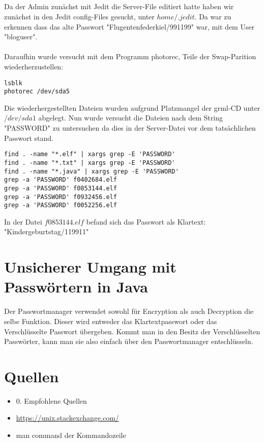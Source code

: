 \documentclass[12pt]{article}
\theoremstyle{plain}
\begin{document}
\subsection{}
Da der Admin zunächst mit Jedit die Server-File editiert hatte haben wir zunächst in den Jedit config-Files gesucht, unter $home/.jedit$. Da war zu erkennen dass das alte Passwort "Flugentenfederkiel/991199" war, mit dem User "bloguser". \\ \\ Daraufhin wurde versucht mit dem Programm photorec, Teile der Swap-Parition wiederherzustellen:
\begin{lstlisting}
lsblk
photorec /dev/sda5
\end{lstlisting}
Die wiederhergestellten Dateien wurden aufgrund Platzmangel der grml-CD unter $/dev/sda1$ abgelegt. Nun wurde versucht die Dateien nach dem String "PASSWORD" zu untersuchen da dies in der Server-Datei vor dem tatsächlichen Passwort stand.
\begin{lstlisting}
find . -name "*.elf" | xargs grep -E 'PASSWORD'
find . -name "*.txt" | xargs grep -E 'PASSWORD'
find . -name "*.java" | xargs grep -E 'PASSWORD'
grep -a 'PASSWORD' f0402684.elf
grep -a 'PASSWORD' f0853144.elf
grep -a 'PASSWORD' f0932456.elf
grep -a 'PASSWORD' f0052256.elf
\end{lstlisting}
In der Datei $f0853144.elf$ befand sich das Passwort als Klartext: "Kindergeburtstag/119911"
\section{Unsicherer Umgang mit Passwörtern in Java}
Der Passwortmanager verwendet sowohl für Encryption als auch Decryption die selbe Funktion. Dieser wird entweder das Klartextpasswort oder das Verschlüsselte Passwort übergeben. Kommt man in den Besitz der Verschlüsselten Passwörter, kann man sie also einfach über den Passwortmanager entschlüsseln.
\section{Quellen}
\begin{itemize}
\item 0. Empfohlene Quellen
\item \url{https://unix.stackexchange.com/}
\item man command der Kommandozeile
\end{itemize}
\end{document}
